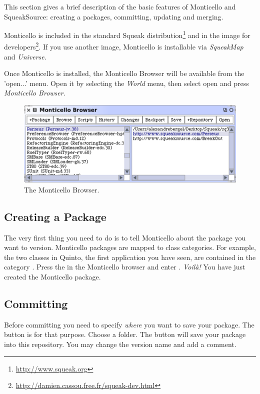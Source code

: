 \documentclass[a4paper,10pt,twoside]{book}
\begin{document}
This section gives a brief description of the basic features of Monticello and SqueakSource: creating a packages, committing, updating and merging.

Monticello is included in the standard Squeak distribution\footnote{\url{http://www.squeak.org}} and in the image for developers\footnote{\url{http://damien.cassou.free.fr/squeak-dev.html}}. If you use another image, Monticello is installable via \emph{SqueakMap} and \emph{Universe}.

Once Monticello is installed, the Monticello Browser will be available from the 'open...' menu. Open it by selecting the \emph{World} menu, then select open and press \emph{Monticello Browser}.

\begin{figure}[ht]\centering
	\includegraphics[width=.75\linewidth]{monticello.png}
	\caption{The Monticello Browser.}
\end{figure}


\subsection{Creating a Package}

The very first thing you need to do is to tell Monticello about the package you want to version. Monticello packages are mapped to class categories. For example, the two classes in Quinto, the first application you have seen, are contained in the category . Press the  in the Monticello browser and enter . \emph{Voil\`a!} You have just created the  Monticello package. 

\subsection{Committing}

Before committing you need to specify \emph{where} you want to save your package. The  button is for that purpose. Choose a folder. The  button will save your package into this repository. You may change the version name and add a comment. 
\end{document}

